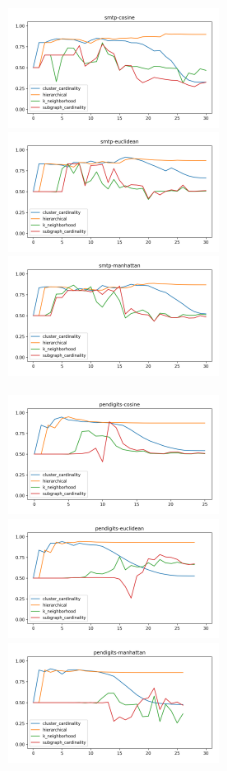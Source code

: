 \begin{figure}[!t]
\includegraphics[width=2.2in]{kdd/static/auc_vs_depth/smtp-cosine.png}
\includegraphics[width=2.2in]{kdd/static/auc_vs_depth/smtp-euclidean.png}
\includegraphics[width=2.2in]{kdd/static/auc_vs_depth/smtp-manhattan.png}

\includegraphics[width=2.2in]{kdd/static/auc_vs_depth/pendigits-cosine.png}
\includegraphics[width=2.2in]{kdd/static/auc_vs_depth/pendigits-euclidean.png}
\includegraphics[width=2.2in]{kdd/static/auc_vs_depth/pendigits-manhattan.png}


\end{figure}
